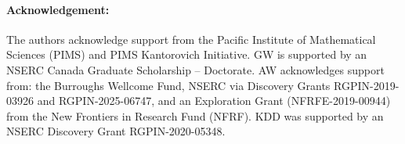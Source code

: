 \documentclass{article}
\newcommand{\1}{\mathbf{1}}
\theoremstyle{definition}
\theoremstyle{remark}
\begin{document}
\paragraph{Acknowledgement:} The authors acknowledge support from the Pacific Institute of Mathematical Sciences (PIMS) and PIMS Kantorovich Initiative. GW is supported by an NSERC Canada Graduate Scholarship – Doctorate. AW acknowledges support from: the Burroughs Wellcome Fund, NSERC via Discovery Grants RGPIN-2019-03926 and RGPIN-2025-06747, and an Exploration Grant (NFRFE-2019-00944) from the New Frontiers in Research Fund (NFRF).
KDD was supported by an NSERC Discovery Grant RGPIN-2020-05348.





\clearpage

\begin{appendices}



\end{appendices}
\end{document}
